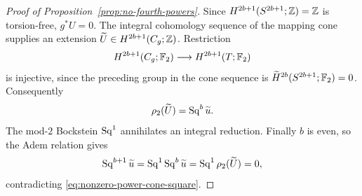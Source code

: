 \begin{proof}[Proof of Proposition~\ref{prop:no-fourth-powers}]
Since $H^{2b+1}(S^{2b+1};\mathbb Z)=\mathbb Z$ is torsion-free, $g^*U=0$.
The integral cohomology sequence of the mapping cone supplies an
extension $\widetilde U\in H^{2b+1}(C_g;\mathbb Z)$.
Restriction
\[
 H^{2b+1}(C_g;\mathbb F_2)\longrightarrow H^{2b+1}(T;\mathbb F_2)
\]
is injective, since the preceding group in the cone sequence is
$\widetilde H^{2b}(S^{2b+1};\mathbb F_2)=0$.
Consequently
\[
 \rho_2(\widetilde U)=\operatorname{Sq}^b\widetilde u.
\]
The mod-$2$ Bockstein $\operatorname{Sq}^1$ annihilates an integral reduction.
Finally $b$ is even, so the Adem relation gives
\[
 \operatorname{Sq}^{b+1}\widetilde u
 =\operatorname{Sq}^1\operatorname{Sq}^b\widetilde u
 =\operatorname{Sq}^1\rho_2(\widetilde U)=0,
\]
contradicting \eqref{eq:nonzero-power-cone-square}.
\end{proof}
